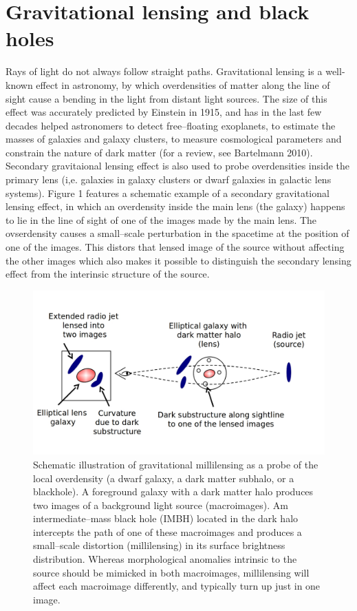 \documentclass[a4paper, 11pt]{article}
\begin{document}
\section{Gravitational lensing and black holes}
Rays of light do not always follow straight paths. Gravitational lensing is a well-known effect in astronomy, by which overdensities of matter along the line of sight cause a bending in the light from distant light sources. The size of this effect was accurately predicted by Einstein in 1915, and has in the last few decades helped astronomers to detect free--floating exoplanets, to estimate the masses of galaxies and galaxy clusters, to measure cosmological parameters and constrain the nature of dark matter (for a review, see Bartelmann 2010). Secondary gravitaional lensing effect is also used to probe overdensities inside the primary lens (i,e. galaxies in galaxy clusters or dwarf galaxies in galactic lens systems). Figure 1 features a schematic example of a secondary gravitational lensing effect, in which an overdensity inside the main lens (the galaxy) happens to lie in the line of sight of one of the images made by the main lens. The ovserdensity causes a small--scale perturbation in the spacetime at the position of one of the images. This distors that lensed image of the source without affecting the other images which also makes it possible to distinguish the secondary lensing effect from the interinsic structure of the source.

\begin{figure}[tbh]
\centering
\includegraphics[scale=0.3]{Figure-lensing-v3.jpg}
\caption{Schematic illustration of gravitational millilensing as a probe of the local overdensity (a dwarf galaxy, a dark matter subhalo, or a blackhole). A foreground galaxy with a dark matter halo produces two images of a background light source (macroimages). Am intermediate--mass black hole (IMBH) located in the dark halo intercepts the path of one of these macroimages and produces a small--scale distortion (millilensing) in its surface brightness distribution. Whereas morphological anomalies intrinsic to the source should be mimicked in both macroimages, millilensing will affect each macroimage differently, and typically turn up just in one image.}
\end{figure}
\end{document}
